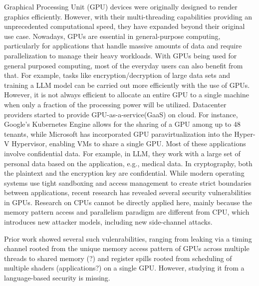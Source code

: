  Graphical Processing Unit (GPU) devices were originally designed to render graphics efficiently.
%
However, with their multi-threading capabilities providing an unprecedented computational speed, they have expanded beyond their original use case.
%
Nowadays, GPUs are essential in general-purpose computing, particularly for applications that handle massive amounts of data and require parallelization to manage their heavy workloads.
%
%
With GPUs being used for general purposed computing, most of the everyday users can also benefit from that.
%
For example, tasks like encryption/decryption of large data sets and training a LLM model can be carried out more efficiently with the use of GPUs.
%
However, it is not always efficient to allocate an entire GPU to a single machine when only a fraction of the processing power will be utilized.
%
Datacenter providers started to provide GPU-as-a-service(GaaS) on cloud.
%
For instance, Google's Kubernetes Engine allows for the sharing of a GPU among up to 48 tenants, while Microsoft has incorporated GPU paravirtualization into the Hyper-V Hypervisor, enabling VMs to share a single GPU.
Most of these applications involve confidential data. 
%
For example, in LLM, they work with a large set of personal data based on the application, e.g., medical data.
%
In cryptography, both the plaintext and the encryption key are confidential.
%
While modern operating systems use tight sandboxing and access management to create strict boundaries between applications, recent research has revealed several security vulnerabilities in GPUs.
%
Research on CPUs cannot be directly applied here, mainly because the memory pattern access and parallelism paradigm are different from CPU, which introduces new attacker models, including new side-channel attacks.

%
%
%
Prior work showed several such vulenrabilities, ranging from leaking via a timing channel rooted from the unique memory access pattern of GPUs across multiple threads to shared memory (?) and register spills rooted from scheduling of multiple shaders (applications?) on a single GPU.
%
However, studying it from a language-based security is missing.
%

